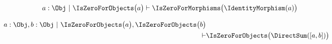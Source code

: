 \begin{sequent}
\begin{align*}
   a: \Obj ~|~ \IsZeroForObjects \big( a \big) \vdash \IsZeroForMorphisms \big( \IdentityMorphism( a ) \big)
\end{align*}
\end{sequent}

\begin{sequent}
\begin{align*}
   a: \Obj, b: \Obj ~|~ \IsZeroForObjects \big( a \big), \IsZeroForObjects \big( b \big) \\
   \vdash & \IsZeroForObjects \big( \DirectSum( [ a, b ] ) \big)
\end{align*}
\end{sequent}
